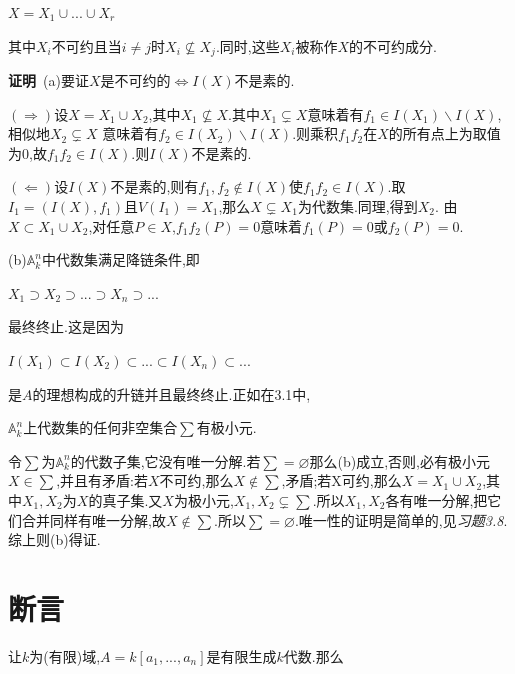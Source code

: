 \documentclass[UTF8]{book}
\begin{document}
		
		\begin{center}
			$X=X_{1}\cup...\cup X_{r}$ 
		\end{center}
		
		
		其中$X_{i}$不可约且当$i\ne j$时$X_{i}\nsubseteq X_{j}$.同时,这些$X_{i}$被称作$ X $的不可约成分.
		
		
		\textbf{证明}\ (a)要证$ X $是不可约的$\iff I(X)$不是素的.
		
		
		$(\Rightarrow)$设$X=X_{1} \cup X_{2}$,其中$X_{1}\nsubseteq X$.其中$X_{1}\varsubsetneq X$意味着有$f_{1}\in I(X_{1})\backslash I(X)$,相似地$X_{2}\varsubsetneq X$ 意味着有$f_{2}\in I(X_{2})\backslash I(X)$.则乘积$f_{1}f_{2}$在$ X $的所有点上为取值为$ 0 $,故$f_{1}f_{2}\in I(X)$.则$ I(X) $不是素的.
		
		
		$(\Leftarrow)$设$ I(X) $不是素的,则有$f_{1},f_{2}\notin I(X)$使$f_{1}f_{2}\in I(X)$.取$I_{1}=(I(X),f_{1})$且$V(I_{1})=X_{1}$,那么$ X \varsubsetneq X_{1}$为代数集.同理,得到$X_{2}$. 由$X\subset X_{1}\cup X_{2}$,对任意$P\in X$,$f_{1}f_{2}(P)=0$意味着$f_{1}(P)=0$或$f_{2}(P)=0$.
		
		
		(b)$\mathbb{A}^{n}_{k}$中代数集满足降链条件,即
		
		
		\begin{center}
			$X_{1}\supset X_{2}\supset ... \supset X_{n} \supset...$
		\end{center}
		
		
		最终终止.这是因为
		
		
		\begin{center}
			$I(X_{1})\subset I(X_{2})\subset ... \subset I(X_{n}) \subset...$
		\end{center}
		
		
		是$ A $的理想构成的升链并且最终终止.正如在3.1中,
		
		
		\begin{center}
			$\mathbb{A}^{n}_{k}$上代数集的任何非空集合$\sum$有极小元.
		\end{center}
		
		
		令$\sum$为$\mathbb{A}^{n}_{k}$的代数子集,它没有唯一分解.若$\sum=\varnothing $那么(b)成立,否则,必有极小元$X\in \sum$,并且有矛盾:若$ X $不可约,那么$X\notin \sum$,矛盾;若X可约,那么$X= X_{1}\cup X_{2}$,其中$X_{1},X_{2}$为$ X $的真子集.又$ X $为极小元,$X_{1},X_{2}\varsubsetneq \sum$.所以$X_{1},X_{2}$各有唯一分解,把它们合并同样有唯一分解,故$X\notin \sum$.所以$\sum =\varnothing$.唯一性的证明是简单的,见\textit{习题3.8}.综上则(b)得证.
	\section{断言}
		让$ k $为(有限)域,$A=k[a_{1},...,a_{n}]$是有限生成$ k $代数.那么
		
\end{document}
